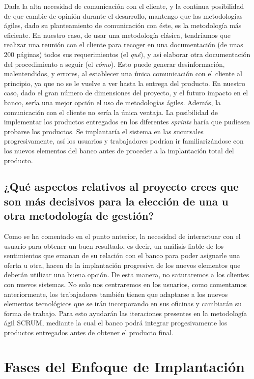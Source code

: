 \documentclass{article}
\begin{document}
Dada la alta necesidad de comunicación con el cliente, y la continua posibilidad de que cambie de opinión durante el desarrollo, mantengo que las metodologías ágiles, dado su planteamiento de comunicación con éste, es la metodología más eficiente. En nuestro caso, de usar una metodología clásica, tendríamos que realizar una reunión con el cliente para recoger en una documentación (de unas 200 páginas) todos sus requerimientos (el \textit{qué}), y así elaborar otra documentación del procedimiento a seguir (el \textit{cómo}). Esto puede generar desinformación, malentendidos, y errores, al establecer una única comunicación con el cliente al principio, ya que no se le vuelve a ver hasta la entrega del producto. En nuestro caso, dado el gran número de dimensiones del proyecto, y el futuro impacto en el banco, sería una mejor opción el uso de metodologías ágiles. Además, la comunicación con el cliente no sería la única ventaja. La posibilidad de implementar los productos entregados en los diferentes \textit{sprints} haría que pudiesen probarse los productos. Se implantaría el sistema en las sucursales progresivamente, así los usuarios y trabajadores podrían ir familiarizándose con los nuevos elementos del banco antes de proceder a la implantación total del producto.

\subsection{¿Qué aspectos relativos al proyecto crees que son más decisivos para la elección de una u otra metodología de gestión?}
Como se ha comentado en el punto anterior, la necesidad de interactuar con el usuario para obtener un buen resultado, es decir, un análisis fiable de los sentimientos que emanan de su relación con el banco para poder asignarle una oferta u otra, hacen de la implantación progresiva de los nuevos elementos que deberán utilizar una buena opción. De esta manera, no saturaremos a los clientes con nuevos sistemas. No solo nos centraremos en los usuarios, como comentamos anteriormente, los trabajadores también tienen que adaptarse a los nuevos elementos tecnológicos que se irán incorporando en sus oficinas y cambiarán su forma de trabajo. Para esto ayudarán las iteraciones presentes en la metodología ágil SCRUM, mediante la cual el banco podrá integrar progesivamente los productos entregados antes de obtener el producto final.

\section{Fases del Enfoque de Implantación}
\end{document}
